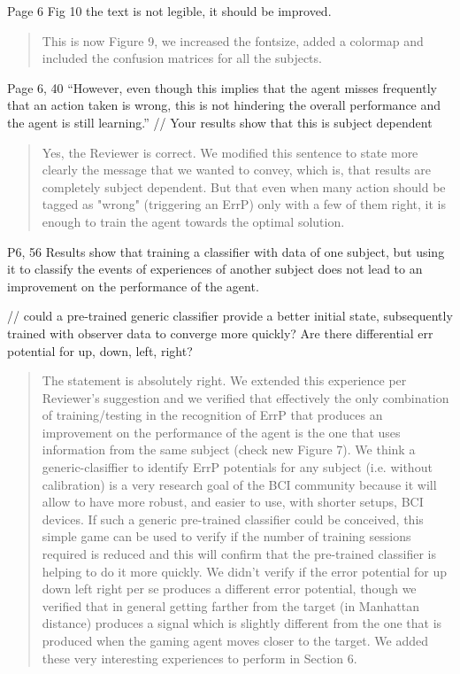 \documentclass[journal,onecolumn,12pt]{IEEEtran}
\begin{document}
Page 6 Fig 10 the text is not legible, it should be improved.

\vspace{2em}
\begin{quotation}
{\color{blue}
This is now Figure 9, we increased the fontsize, added a colormap and included the confusion matrices for all the subjects.
}
\end{quotation}
\vspace{2em}

Page 6, 40
“However, even though this implies that the agent misses frequently that an action taken is wrong, this is not hindering the overall performance and the agent is still learning.”
// Your results show that this is subject dependent

\vspace{2em}
\begin{quotation}
{\color{blue}
Yes, the Reviewer is correct.  We modified this sentence to state more clearly the message that we wanted to convey, which is, that results are completely subject dependent.  But that even when many action should be tagged as "wrong" (triggering an ErrP) only with a few of them right, it is enough to train the agent towards the optimal solution.
}
\end{quotation}
\vspace{2em}

P6, 56
Results show that training a classifier with data of one subject, but using it
to classify the events of experiences of another subject does
not lead to an improvement on the performance of the agent.

// could a pre-trained generic classifier provide a better initial state, subsequently trained with observer data to converge more quickly?
Are there differential err potential for up, down, left, right?

\vspace{2em}
\begin{quotation}
{\color{blue}
The statement is absolutely right.  We extended this experience per Reviewer's suggestion and we verified that effectively the only combination of training/testing in the recognition of ErrP that produces an improvement on the performance of the agent is the one that uses information from the same subject (check new Figure 7).   We think a generic-clasiffier to identify ErrP potentials for any subject (i.e. without calibration) is a very research goal of the BCI community because it will allow to have more robust, and easier to use, with shorter setups, BCI devices.  If such a generic pre-trained classifier could be conceived, this simple game can be used to verify if the number of training sessions required is reduced and this will confirm that the pre-trained classifier is helping to do it more quickly.  We didn't verify if the error potential for up down left right per se produces a different error potential, though we verified that in general getting farther from the target (in Manhattan distance) produces a signal which is slightly different from the one that is produced when the gaming agent moves closer to the target.  We added these very interesting experiences to perform in Section 6.
}
\end{quotation}
\vspace{2em}
\end{document}
